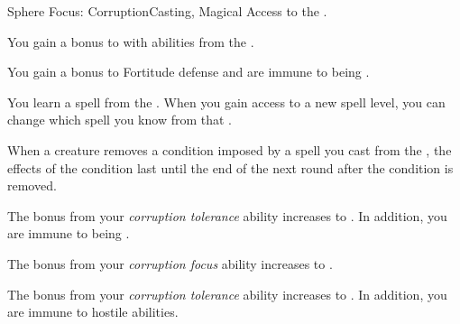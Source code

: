     \begin{feat}{Sphere Focus: Corruption}{Casting, Magical}
        \featpre Access to the  .

         You gain a  bonus to  with abilities from the  .

         You gain a  bonus to Fortitude defense and are immune to being .

         You learn a spell from the  .
        When you gain access to a new spell level, you can change which spell you know from that .

         When a creature removes a condition imposed by a spell you cast from the  , the effects of the condition last until the end of the next round after the condition is removed.

         The bonus from your \textit{corruption tolerance} ability increases to .
        In addition, you are immune to being .

         The bonus from your \textit{corruption focus} ability increases to .

         The bonus from your \textit{corruption tolerance} ability increases to .
        In addition, you are immune to hostile  abilities.
    \end{feat}

